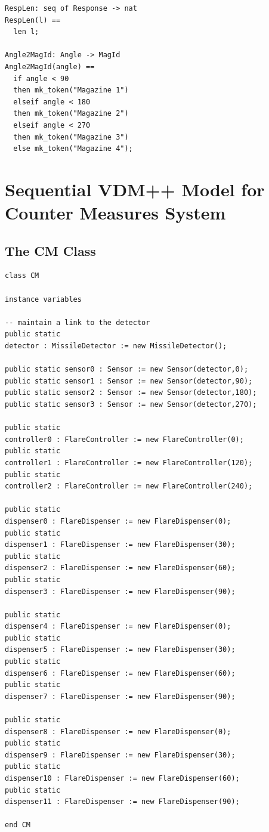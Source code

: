\documentclass{overturerepchap}
\begin{document}
\begin{lstlisting}
RespLen: seq of Response -> nat
RespLen(l) ==
  len l;

Angle2MagId: Angle -> MagId
Angle2MagId(angle) ==
  if angle < 90
  then mk_token("Magazine 1")
  elseif angle < 180
  then mk_token("Magazine 2")
  elseif angle < 270
  then mk_token("Magazine 3")
  else mk_token("Magazine 4");
\end{lstlisting}

\section{Sequential VDM++ Model for Counter Measures System}

\subsection{The CM Class}

\begin{lstlisting}
class CM

instance variables

-- maintain a link to the detector
public static 
detector : MissileDetector := new MissileDetector();

public static sensor0 : Sensor := new Sensor(detector,0);
public static sensor1 : Sensor := new Sensor(detector,90);
public static sensor2 : Sensor := new Sensor(detector,180);
public static sensor3 : Sensor := new Sensor(detector,270);

public static 
controller0 : FlareController := new FlareController(0);
public static 
controller1 : FlareController := new FlareController(120);
public static 
controller2 : FlareController := new FlareController(240);

public static 
dispenser0 : FlareDispenser := new FlareDispenser(0);
public static 
dispenser1 : FlareDispenser := new FlareDispenser(30);
public static 
dispenser2 : FlareDispenser := new FlareDispenser(60);
public static 
dispenser3 : FlareDispenser := new FlareDispenser(90);

public static 
dispenser4 : FlareDispenser := new FlareDispenser(0);
public static 
dispenser5 : FlareDispenser := new FlareDispenser(30);
public static 
dispenser6 : FlareDispenser := new FlareDispenser(60);
public static 
dispenser7 : FlareDispenser := new FlareDispenser(90);

public static 
dispenser8 : FlareDispenser := new FlareDispenser(0);
public static 
dispenser9 : FlareDispenser := new FlareDispenser(30);
public static 
dispenser10 : FlareDispenser := new FlareDispenser(60);
public static 
dispenser11 : FlareDispenser := new FlareDispenser(90);

end CM
\end{lstlisting}
\end{document}

